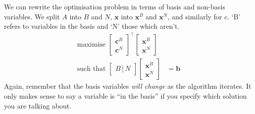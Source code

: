 \documentclass[11pt,a4paper]{article} %
\begin{document}
We can rewrite the optimisation problem in terms of basis
and non-basis variables. We split $A$ into $B$ and $N$,  
$\bm x$ into $\bm x^B$ and $\bm x^N$, and similarly for $c$. 
`B' refers to variables in the basis and `N' those which aren't.
\begin{align*}
    \text{maximise }\begin{bmatrix}
        \bm c^B \\ \bm c^N
    \end{bmatrix}^\top \begin{bmatrix}
        \bm x^B \\ \bm x^N
    \end{bmatrix} &\\ 
    \text{such that }\begin{bmatrix}
        B\,|\,N
    \end{bmatrix}\begin{bmatrix}
        \bm x^B \\ \bm x^N
    \end{bmatrix} &= \bm b
\end{align*} 
Again, remember that the basis variables \textit{will change} as the algorithm 
iterates. It only makes sense to say a variable is ``in the basis'' if you 
specify which solution you are talking about. 
\end{document}
